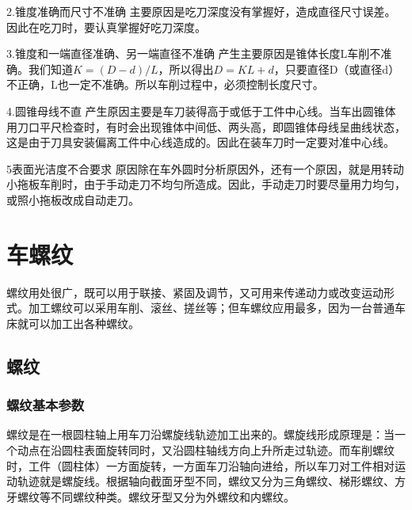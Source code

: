 \documentclass{ctexbook}
\begin{document}
2.锥度准确而尺寸不准确 主要原因是吃刀深度没有掌握好，造成直径尺寸误差。因此在吃刀时，要认真掌握好吃刀深度。

3.锥度和一端直径准确、另一端直径不准确 产生主要原因是锥体长度L车削不准确。我们知道$K=(D-d)/L$，所以得出$D=KL+d$，只要直径D（或直径d）不正确，L也一定不准确。所以车削过程中，必须控制长度尺寸。

4.圆锥母线不直 产生原因主要是车刀装得高于或低于工件中心线。当车出圆锥体用刀口平尺检查时，有时会出现锥体中间低、两头高，即圆锥体母线呈曲线状态，这是由于刀具安装偏离工件中心线造成的。因此在装车刀时一定要对准中心线。

5表面光洁度不合要求 原因除在车外圆时分析原因外，还有一个原因，就是用转动小拖板车削时，由于手动走刀不均匀所造成。因此，手动走刀时要尽量用力均匀，或照小拖板改成自动走刀。
\section{车螺纹}
螺纹用处很广，既可以用于联接、紧固及调节，又可用来传递动力或改变运动形式。加工螺纹可以采用车削、滚丝、搓丝等；但车螺纹应用最多，因为一台普通车床就可以加工出各种螺纹。
\subsection{螺纹}
\subsubsection{螺纹基本参数}
螺纹是在一根圆柱轴上用车刀沿螺旋线轨迹加工出来的。螺旋线形成原理是：当一个动点在沿圆柱表面旋转同时，又沿圆柱轴线方向上升所走过轨迹。而车削螺纹时，工件（圆柱体）一方面旋转，一方面车刀沿轴向进给，所以车刀对工件相对运动轨迹就是螺旋线。根据轴向截面牙型不同，螺纹又分为三角螺纹、梯形螺纹、方牙螺纹等不同螺纹种类。螺纹牙型又分为外螺纹和内螺纹。
\end{document}
